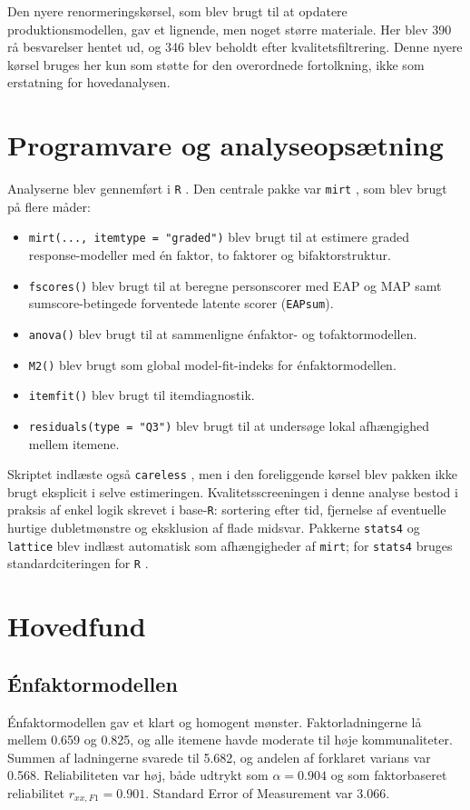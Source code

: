 \documentclass[11pt,a4paper]{article}
\begin{document}
Den nyere renormeringskørsel, som blev brugt til at opdatere produktionsmodellen, gav et lignende, men noget større materiale. Her blev 390 rå besvarelser hentet ud, og 346 blev beholdt efter kvalitetsfiltrering. Denne nyere kørsel bruges her kun som støtte for den overordnede fortolkning, ikke som erstatning for hovedanalysen.

\section{Programvare og analyseopsætning}
Analyserne blev gennemført i \texttt{R} \parencite{RCore2026}. Den centrale pakke var \texttt{mirt} \parencite{Chalmers2012mirt}, som blev brugt på flere måder:

\begin{itemize}
\item \texttt{mirt(..., itemtype = "graded")} blev brugt til at estimere graded response-modeller med én faktor, to faktorer og bifaktorstruktur.
\item \texttt{fscores()} blev brugt til at beregne personscorer med EAP og MAP samt sumscore-betingede forventede latente scorer (\texttt{EAPsum}).
\item \texttt{anova()} blev brugt til at sammenligne énfaktor- og tofaktormodellen.
\item \texttt{M2()} blev brugt som global model-fit-indeks for énfaktormodellen.
\item \texttt{itemfit()} blev brugt til itemdiagnostik.
\item \texttt{residuals(type = "Q3")} blev brugt til at undersøge lokal afhængighed mellem itemene.
\end{itemize}

Skriptet indlæste også \texttt{careless} \parencite{YentesWilhelm2023careless}, men i den foreliggende kørsel blev pakken ikke brugt eksplicit i selve estimeringen. Kvalitetsscreeningen i denne analyse bestod i praksis af enkel logik skrevet i base-\texttt{R}: sortering efter tid, fjernelse af eventuelle hurtige dubletmønstre og eksklusion af flade midsvar. Pakkerne \texttt{stats4} og \texttt{lattice} \parencite{Sarkar2008lattice} blev indlæst automatisk som afhængigheder af \texttt{mirt}; for \texttt{stats4} bruges standardciteringen for \texttt{R} \parencite{RCore2026}.

\section{Hovedfund}
\subsection{Énfaktormodellen}
Énfaktormodellen gav et klart og homogent mønster. Faktorladningerne lå mellem 0.659 og 0.825, og alle itemene havde moderate til høje kommunaliteter. Summen af ladningerne svarede til 5.682, og andelen af forklaret varians var 0.568. Reliabiliteten var høj, både udtrykt som $\alpha = 0.904$ og som faktorbaseret reliabilitet $r_{xx,F1} = 0.901$. Standard Error of Measurement var 3.066.
\end{document}
